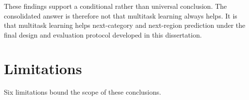 These findings support a conditional rather than universal conclusion.
The consolidated answer is therefore not that multitask learning always helps.
It is that multitask learning helps next-category and next-region prediction under
the final design and evaluation protocol developed in this dissertation.

\section{Limitations}
\label{sec:conc:limitations}

Six limitations bound the scope of these conclusions.

\begin{enumerate}

\end{enumerate}
